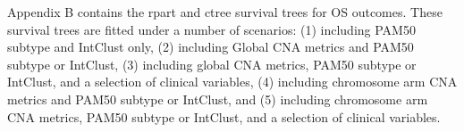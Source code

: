 {}


Appendix B contains the rpart and ctree survival trees for OS outcomes. These survival trees are fitted under a number of scenarios: (1) including PAM50 subtype and IntClust only, (2) including Global CNA metrics and PAM50 subtype or IntClust, (3) including global CNA metrics, PAM50 subtype or IntClust, and a selection of clinical variables, (4) including chromosome arm CNA metrics and PAM50 subtype or IntClust, and (5) including chromosome arm CNA metrics, PAM50 subtype or IntClust, and a selection of clinical variables. 


